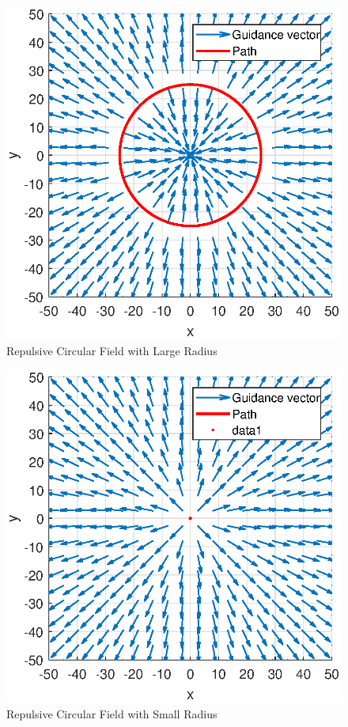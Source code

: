 \documentclass[numbered,pdftex]{ohio-etd}
\begin{document}
\begin{figure}[H]
	\centering
	\includegraphics[width=0.7\linewidth]{Figures/methods/largeRepulsive}
	\caption{Repulsive Circular Field with Large Radius}
	\label{fig:largerepulsive}
\end{figure}

\begin{figure}[H]
	\centering
	\includegraphics[width=0.7\linewidth]{Figures/methods/normalizedRepulsive}
	\caption{Repulsive Circular Field with Small Radius}
	\label{fig:normalizedrepulsive}
\end{figure}
\end{document}

